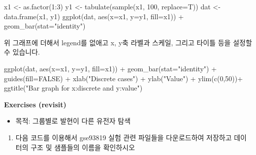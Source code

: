 \documentclass[
]{book}
\newenvironment{Shaded}{\begin{snugshade}}{\end{snugshade}}
\newcommand{\AttributeTok}[1]{\textcolor[rgb]{0.77,0.63,0.00}{#1}}
\newcommand{\ConstantTok}[1]{\textcolor[rgb]{0.00,0.00,0.00}{#1}}
\newcommand{\DecValTok}[1]{\textcolor[rgb]{0.00,0.00,0.81}{#1}}
\newcommand{\FunctionTok}[1]{\textcolor[rgb]{0.00,0.00,0.00}{#1}}
\newcommand{\NormalTok}[1]{#1}
\newcommand{\OtherTok}[1]{\textcolor[rgb]{0.56,0.35,0.01}{#1}}
\newcommand{\SpecialCharTok}[1]{\textcolor[rgb]{0.00,0.00,0.00}{#1}}
\newcommand{\StringTok}[1]{\textcolor[rgb]{0.31,0.60,0.02}{#1}}
\providecommand{\tightlist}{%
  \setlength{\itemsep}{0pt}\setlength{\parskip}{0pt}}
\begin{document}
\begin{Shaded}
\begin{Highlighting}[]
\NormalTok{x1 }\OtherTok{\textless{}{-}} \FunctionTok{as.factor}\NormalTok{(}\DecValTok{1}\SpecialCharTok{:}\DecValTok{3}\NormalTok{)}
\NormalTok{y1 }\OtherTok{\textless{}{-}} \FunctionTok{tabulate}\NormalTok{(}\FunctionTok{sample}\NormalTok{(x1, }\DecValTok{100}\NormalTok{, }\AttributeTok{replace=}\NormalTok{T))}
\NormalTok{dat }\OtherTok{\textless{}{-}} \FunctionTok{data.frame}\NormalTok{(x1, y1)}
\FunctionTok{ggplot}\NormalTok{(dat, }\FunctionTok{aes}\NormalTok{(}\AttributeTok{x=}\NormalTok{x1, }\AttributeTok{y=}\NormalTok{y1, }\AttributeTok{fill=}\NormalTok{x1)) }\SpecialCharTok{+}
  \FunctionTok{geom\_bar}\NormalTok{(}\AttributeTok{stat=}\StringTok{"identity"}\NormalTok{) }
\end{Highlighting}
\end{Shaded}

위 그래프에 더해서 legend를 없애고 x, y축 라벨과 스케일, 그리고 타이틀 등을 설정할 수 있습니다.

\begin{Shaded}
\begin{Highlighting}[]
\FunctionTok{ggplot}\NormalTok{(dat, }\FunctionTok{aes}\NormalTok{(}\AttributeTok{x=}\NormalTok{x1, }\AttributeTok{y=}\NormalTok{y1, }\AttributeTok{fill=}\NormalTok{x1)) }\SpecialCharTok{+}
  \FunctionTok{geom\_bar}\NormalTok{(}\AttributeTok{stat=}\StringTok{"identity"}\NormalTok{) }\SpecialCharTok{+}
  \FunctionTok{guides}\NormalTok{(}\AttributeTok{fill=}\ConstantTok{FALSE}\NormalTok{) }\SpecialCharTok{+}
  \FunctionTok{xlab}\NormalTok{(}\StringTok{"Discrete cases"}\NormalTok{) }\SpecialCharTok{+} 
  \FunctionTok{ylab}\NormalTok{(}\StringTok{"Value"}\NormalTok{) }\SpecialCharTok{+}
  \FunctionTok{ylim}\NormalTok{(}\FunctionTok{c}\NormalTok{(}\DecValTok{0}\NormalTok{,}\DecValTok{50}\NormalTok{))}\SpecialCharTok{+}
  \FunctionTok{ggtitle}\NormalTok{(}\StringTok{"Bar graph for x:discrete and y:value"}\NormalTok{)}
\end{Highlighting}
\end{Shaded}

\textbf{Exercises (revisit) }

\begin{itemize}
\tightlist
\item
  목적: 그룹별로 발현이 다른 유전자 탐색
\end{itemize}

\begin{enumerate}
\def\labelenumi{\arabic{enumi}.}
\tightlist
\item
  다음 코드를 이용해서 gse93819 실험 관련 파일들을 다운로드하여 저장하고 데이터의 구조 및 샘플들의 이름을 확인하시오
\end{enumerate}
\end{document}
